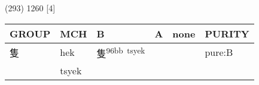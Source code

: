 \documentclass[14pt,a4paper]{scrartcl}
\begin{document}
(293) 1260 {[}4{]}

\begin{longtable}[c]{@{}llllll@{}}
\toprule
\begin{minipage}[b]{0.14\columnwidth}\raggedright\strut
GROUP
\strut\end{minipage} &
\begin{minipage}[b]{0.14\columnwidth}\raggedright\strut
MCH
\strut\end{minipage} &
\begin{minipage}[b]{0.14\columnwidth}\raggedright\strut
B
\strut\end{minipage} &
\begin{minipage}[b]{0.14\columnwidth}\raggedright\strut
A
\strut\end{minipage} &
\begin{minipage}[b]{0.14\columnwidth}\raggedright\strut
none
\strut\end{minipage} &
\begin{minipage}[b]{0.14\columnwidth}\raggedright\strut
PURITY
\strut\end{minipage}\tabularnewline
\midrule
\endhead
\begin{minipage}[t]{0.14\columnwidth}\raggedright\strut
隻
\strut\end{minipage} &
\begin{minipage}[t]{0.14\columnwidth}\raggedright\strut
hek
\strut\end{minipage} &
\begin{minipage}[t]{0.14\columnwidth}\raggedright\strut
隻\textsuperscript{96bb~tsyek}
\strut\end{minipage} &
\begin{minipage}[t]{0.14\columnwidth}\raggedright\strut
\strut\end{minipage} &
\begin{minipage}[t]{0.14\columnwidth}\raggedright\strut
\strut\end{minipage} &
\begin{minipage}[t]{0.14\columnwidth}\raggedright\strut
pure:B
\strut\end{minipage}\tabularnewline
\begin{minipage}[t]{0.14\columnwidth}\raggedright\strut
𤕬
\strut\end{minipage} &
\begin{minipage}[t]{0.14\columnwidth}\raggedright\strut
tsyek
\strut\end{minipage} &
\begin{minipage}[t]{0.14\columnwidth}\raggedright\strut
\strut\end{minipage} &

\end{longtable}
\end{document}
